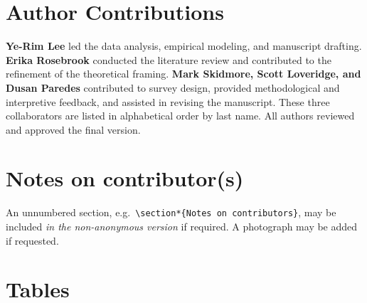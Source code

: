 \documentclass[]{interact}
\theoremstyle{plain}%
\theoremstyle{definition}
\theoremstyle{remark}
\begin{document}
\section*{Author Contributions}

\textbf{Ye-Rim Lee} led the data analysis, empirical modeling, and manuscript drafting. \textbf{Erika Rosebrook} conducted the literature review and contributed to the refinement of the theoretical framing. \textbf{Mark Skidmore, Scott Loveridge, and Dusan Paredes} contributed to survey design, provided methodological and interpretive feedback, and assisted in revising the manuscript. These three collaborators are listed in alphabetical order by last name. All authors reviewed and approved the final version.

\section*{Notes on contributor(s)}

An unnumbered section, e.g.\ \verb"\section*{Notes on contributors}", may be included \emph{in the non-anonymous version} if required. A photograph may be added if requested.


\clearpage
{}
\section*{Tables}
\label{sec:tables}


% 


% 

% 


\newpage



\end{document}

